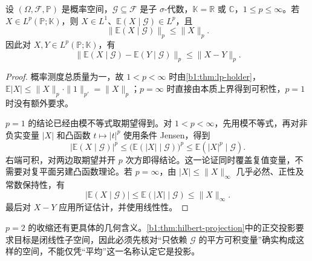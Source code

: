 \begin{proposition}\label{b1:prop:conditional-expectation-contraction-31}
设 \((\Omega,\mathcal F,\mathbb P)\) 是概率空间，\(\mathcal G\subseteq\mathcal F\) 是子 \(\sigma\)-代数，\(\mathbb K=\mathbb R\) 或 \(\mathbb C\)，\(1\leq p\leq\infty\)。若 \(X\in L^p(\mathbb P;\mathbb K)\)，则 \(X\in L^1\)、\(\mathbb E(X\mid\mathcal G)\in L^p\)，且
\begin{equation}\label{b1:eq:conditional-expectation-lp-contraction-31}
 \|\mathbb E(X\mid\mathcal G)\|_p\leq\|X\|_p.
\end{equation}
因此对 \(X,Y\in L^p(\mathbb P;\mathbb K)\)，有
\[
 \|\mathbb E(X\mid\mathcal G)-\mathbb E(Y\mid\mathcal G)\|_p
 \leq\|X-Y\|_p.
\]
\end{proposition}
\begin{proof}
概率测度总质量为一，故 \(1<p<\infty\) 时由\cref{b1:thm:lp-holder}，
\(\mathbb E|X|\leq\|X\|_p\cdot\|1\|_{p'}=\|X\|_p\)；\(p=\infty\) 时直接由本质上界得到可积性，\(p=1\) 时没有额外要求。

\(p=1\) 的结论已经由模不等式取期望得到。对 \(1<p<\infty\)，先用模不等式，再对非负实变量 \(|X|\) 和凸函数 \(t\mapsto|t|^p\) 使用条件 Jensen，得到
\[
 |\mathbb E(X\mid\mathcal G)|^p
 \leq\bigl(\mathbb E(|X|\mid\mathcal G)\bigr)^p
 \leq\mathbb E(|X|^p\mid\mathcal G).
\]
右端可积，对两边取期望并开 \(p\) 次方即得结论。这一论证同时覆盖复值变量，不需要对复平面另建凸函数理论。若 \(p=\infty\)，由 \(|X|\leq\|X\|_\infty\) 几乎必然、正性及常数保持性，有
\[
 |\mathbb E(X\mid\mathcal G)|
 \leq\mathbb E(|X|\mid\mathcal G)\leq\|X\|_\infty.
\]
最后对 \(X-Y\) 应用所证估计，并使用线性性。
\end{proof}

\(p=2\) 的收缩还有更具体的几何含义。\cref{b1:thm:hilbert-projection}中的正交投影要求目标是闭线性子空间，因此必须先核对“只依赖 \(\mathcal G\) 的平方可积变量”确实构成这样的空间，不能仅凭“平均”这一名称认定它是投影。


